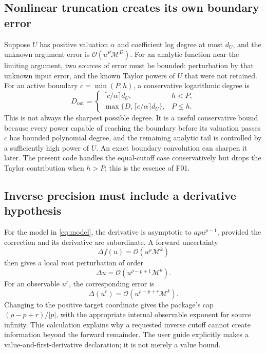 \documentclass[11pt,letterpaper]{article}
\newcommand{\code}[1]{\texttt{\small\detokenize{#1}}}
\newcommand{\OO}{\mathcal O}
\newcommand{\M}{\mathcal M}
\begin{document}
\subsection{Nonlinear truncation creates its own boundary error}
Suppose $U$ has positive valuation $\alpha$ and coefficient log degree at most $d_U$, and the unknown argument error is $\OO(u^P\M^D)$. For an analytic function near the limiting argument, two sources of error must be bounded: perturbation by that unknown input error, and the known Taylor powers of $U$ that were not retained. For an active boundary $c=\min(P,h)$, a conservative logarithmic degree is
\begin{equation}
 D_{\mathrm{out}}=
 \begin{cases}
  \lceil c/\alpha\rceil d_U,&h<P,\\
  \max\{D,\lceil c/\alpha\rceil d_U\},&P\le h.
 \end{cases}
 \label{eq:unitbound}
\end{equation}
This is not always the sharpest possible degree. It is a useful conservative bound because every power capable of reaching the boundary before its valuation passes $c$ has bounded polynomial degree, and the remaining analytic tail is controlled by a sufficiently high power of $U$. An exact boundary convolution can sharpen it later. The present code handles the equal-cutoff case conservatively but drops the Taylor contribution when $h>P$; this is the essence of F01.

\subsection{Inverse precision must include a derivative hypothesis}
For the model in \eqref{eq:model}, the derivative is asymptotic to $ap u^{p-1}$, provided the correction and its derivative are subordinate. A forward uncertainty
\[
 \Delta f(u)=\OO(u^\rho\M^k)
\]
then gives a local root perturbation of order
\[
 \Delta u=\OO(u^{\rho-p+1}\M^k).
\]
For an observable $u^r$, the corresponding error is
\begin{equation}
 \Delta(u^r)=\OO(u^{\rho-p+r}\M^k).
 \label{eq:inversecap}
\end{equation}
Changing to the positive target coordinate gives the package's cap $(\rho-p+r)/|p|$, with the appropriate internal observable exponent for source infinity. This calculation explains why a requested inverse cutoff cannot create information beyond the forward remainder. The user guide explicitly makes \code{InputRemainder -> {rho,k}} a value-and-first-derivative declaration; it is not merely a value bound.\cite{repo-core,repo-guide}
\end{document}
